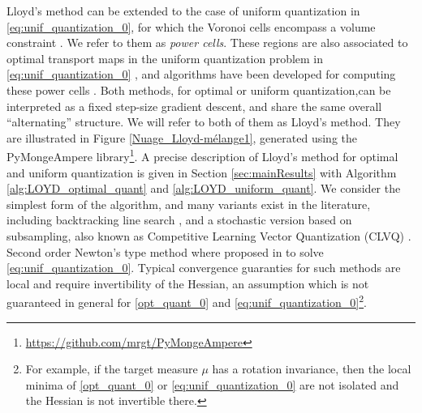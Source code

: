 \documentclass[11pt]{article}
\newcommand{\1}{\mathbbm{1}}
\numberwithin{equation}{section}
\begin{document}
Lloyd's method can be extended to the case of uniform quantization in \eqref{eq:unif_quantization_0}, for which the Voronoi cells encompass a volume constraint \cite{balzer2009capacity}. We refer to them as \emph{power cells}. These regions are also associated to optimal transport maps in the uniform quantization problem in \eqref{eq:unif_quantization_0} \cite{de2012blue}, and algorithms have been developed for computing these power cells \cite{refnewton}.
Both methods, for optimal or uniform quantization,can be interpreted as a fixed step-size gradient descent, and share the same overall ``alternating'' structure. We will refer to both of them as Lloyd's method. 
They are illustrated in Figure \ref{Nuage_Lloyd-mélange1}, generated using the PyMongeAmpere library\footnote{\label{note1}\href{https://github.com/mrgt/PyMongeAmpere}{https://github.com/mrgt/PyMongeAmpere}}. A precise description of Lloyd's method for optimal and uniform quantization is given in Section \ref{sec:mainResults} with Algorithm \ref{alg:LOYD_optimal_quant} and \ref{alg:LOYD_uniform_quant}. We consider the simplest form of the algorithm, and many variants exist in the literature, including backtracking line search  \cite{de2012blue,refhess} , and a stochastic version based on subsampling, also known as Competitive Learning Vector Quantization (CLVQ) \cite{bouton1997multidimensional}.  Second order Newton's type method where proposed in \cite{refhess} to solve \eqref{eq:unif_quantization_0}. Typical convergence guaranties for such methods are local and require invertibility of the Hessian, an assumption which is not guaranteed in general for \eqref{opt_quant_0} and \eqref{eq:unif_quantization_0}\footnote{For example, if the target measure $\mu$ has a rotation invariance, then the local minima of \eqref{opt_quant_0} or \eqref{eq:unif_quantization_0} are not isolated and the Hessian is not invertible there.}.
\end{document}
